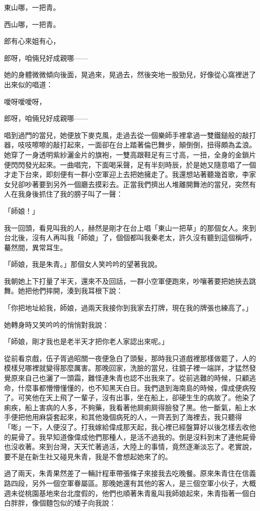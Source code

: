 \documentclass[b5paper,11pt,twoside,twocolumn]{ctexbook}
\begin{document}
東山哪，一把青。

西山哪，一把青。

郎有心來姐有心，

郎呀，咱倆兒好成親哪——

她的身體微微傾向後面，晃過來，晃過去，然後突地一股勁兒，好像從心窩裡迸了出來似的唱道：

噯呀噯噯呀，

郎呀，咱倆兒好成親哪——

唱到過門的當兒，她便放下麥克風，走過去從一個樂師手裡拿過一雙鐵鎚般的敲打器，吱吱嚓嚓的敲打起來，一面卻在台上踏著倫巴舞步，顛倒倒，扭得頗為孟浪。她穿了一身透明紫紗灑金片的旗袍，一雙高跟鞋足有三寸高，一扭，全身的金鎖片便閃閃發光起來。一曲唱完，下面喝采聲，足有半刻時辰，於是她又隨意唱了一個才走下台來，即刻便有一群小空軍迎上去把她擁走了。我還想站著聽幾首歌，李家女兒卻吵著要到另外一個廳去摸彩去。正當我們擠出人堆離開舞池的當兒，突然有人在我身後抓住了我的膀子叫了一聲：

「師娘！」

我一回頭，看見叫我的人，赫然是剛才在台上唱「東山一把草」的那個女人。來到台北後，沒有人再叫我「師娘」了，個個都叫我秦老太，許久沒有聽到這個稱呼，驀然間，異常耳生。

「師娘，我是朱青。」那個女人笑吟吟的望著我說。

我朝她上下打量了半天，還來不及回話，一群小空軍便跑來，吵嚷著要把她挾去跳舞。她把他們摔開，湊到我耳根下說：

「你把地址給我，師娘，過兩天我接你到我家去打牌，現在我的牌張也練高了。」

她轉身時又笑吟吟的悄悄對我說：

「師娘，剛才我也是老半天才把你老人家認出來呢。」

從前看京戲，伍子胥過昭關一夜便急白了頭髮，那時我只道戲裡那樣做罷了，人的模樣兒哪裡就變得那麼厲害。那晚回家，洗臉的當兒，往鏡子裡一端詳，才猛然發覺原來自己也灑了一頭霜，難怪連朱青也認不出我來了。從前逃難的時候，只顧逃命，什麼事都懵懵懂懂的，也不知黑天白日。我們退到海南島的時候，偉成便病歿了。可笑他在天上飛了一輩子，沒有出事，坐在船上，卻硬生生的病故了。他染了痢疾，船上害病的人多，不夠藥，我看著他屙痢屙得臉發了黑。他一斷氣，船上水手便把他用麻袋套起來，和其他幾個病死的人，一齊丟到了海裡去，我只聽得「嘭」一下，人便沒了。打我嫁給偉成那天起，我心裡已經盤算好以後怎樣去收他的屍骨了。我早知道像偉成他們那種人，是活不過我的。倒是沒料到末了連他屍骨也沒收著。來到台灣，天天忙著過活，大陸上的事情，竟然逐漸淡忘了。老實說，要不是在新生社又碰見朱青，我是不會想起她來了的。

過了兩天，朱青果然差了一輛計程車帶張條子來接我去吃晚餐。原來朱青住在信義路四段，另外一個空軍眷屬區。那晚她還有其他的客人，是三個空軍小伙子，大概週未從桃園基地來台北度假的，他們也順著朱青亂叫我師娘起來，朱青指著一個白白胖胖，像個麵包似的矮子向我說：
\end{document}
